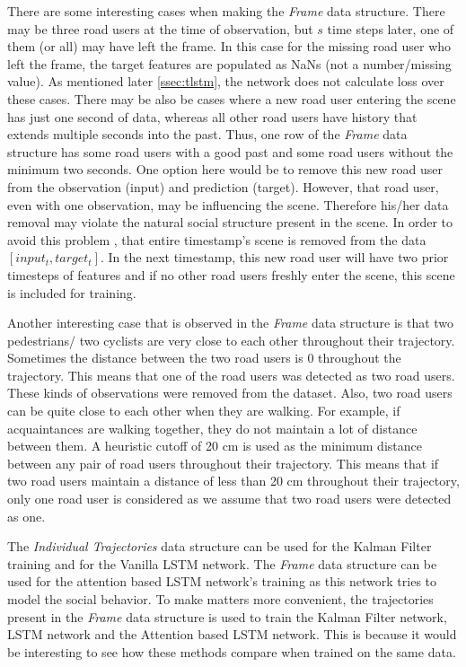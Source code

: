\documentclass{article}
\begin{document}
There are some interesting cases when making the \textit{Frame} data structure. There may be three road users at the time of observation, but $s$ time steps later, one of them (or all) may have left the frame. In this case for the missing road user who left the frame, the target features are populated as NaNs (not a number/missing value). As mentioned later \ref{ssec:tlstm}, the network does not calculate loss over these cases. There may be also be cases where a new road user entering the scene has just one second of data, whereas all other road users have history that extends multiple seconds into the past. Thus, one row of the \textit{Frame} data structure has some road users with a good past and some road users without the minimum two seconds.  One option here would be to remove this new road user from the observation (input) and prediction (target). However, that road user, even with one observation, may be influencing the scene. Therefore his/her data removal may violate the natural social structure present in the scene. In order to avoid this problem , that entire timestamp's scene is removed from the data $[input_t,target_t]$. In the next timestamp, this new road user will have two prior timesteps of features and if no other road users freshly enter the scene, this scene is included for training. 

Another interesting case that is observed in the \textit{Frame} data structure is that two pedestrians/ two cyclists are very close to each other throughout their trajectory. Sometimes the distance between the two road users is 0 throughout the trajectory. This means that one of the road users was detected as two road users. These kinds of observations were removed from the dataset. Also, two road users can be quite close to each other when they are walking. For example, if acquaintances are walking together, they do not maintain a lot of distance between them. A heuristic cutoff of 20 cm is used as the minimum distance between any pair of road users throughout their trajectory. This means that if two road users maintain a distance of less than 20 cm throughout their trajectory, only one road user is considered as we assume that two road users were detected as one. 


 The \textit{Individual Trajectories} data structure can be used for the Kalman Filter training and for the Vanilla LSTM network. The \textit{Frame} data structure can be used for the attention based LSTM network's training as this network tries to model the social behavior. To make matters more convenient, the trajectories present in the \textit{Frame} data structure is used to train the Kalman Filter network, LSTM network and the Attention based LSTM network. This is because it would be interesting to see how these methods compare when trained on the same data.
\end{document}
